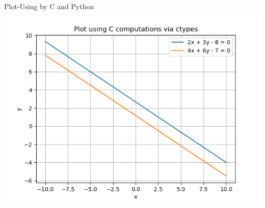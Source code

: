 \documentclass{beamer}
\begin{document}
\begin{frame}{Plot-Using by C and Python}
    \centering
    \includegraphics[width=\columnwidth, height=0.8\textheight, keepaspectratio]{figs/fig10.1.png}     
\end{frame}
\end{document}
